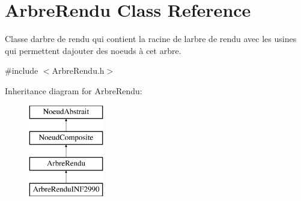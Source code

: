 \hypertarget{class_arbre_rendu}{}\section{Arbre\+Rendu Class Reference}
\label{class_arbre_rendu}


Classe d\textquotesingle{}arbre de rendu qui contient la racine de l\textquotesingle{}arbre de rendu avec les usines qui permettent d\textquotesingle{}ajouter des noeuds à cet arbre.  




{\ttfamily \#include $<$Arbre\+Rendu.\+h$>$}

Inheritance diagram for Arbre\+Rendu\+:\begin{figure}[H]
\begin{center}
\leavevmode
\includegraphics[height=4.000000cm]{class_arbre_rendu}
\end{center}
\end{figure}
